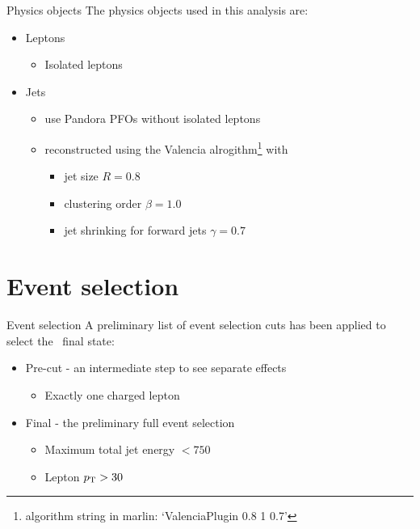 \documentclass{beamer}
\begin{document}
\begin{frame}{Physics objects}
The physics objects used in this analysis are:
\begin{itemize}
  \item Leptons
  \begin{itemize}
    \item Isolated leptons
  \end{itemize}
  \item Jets
  \begin{itemize}
    \item use Pandora PFOs without isolated leptons
    \item reconstructed using the Valencia alrogithm\footnote{algorithm string in marlin: `ValenciaPlugin 0.8 1 0.7'} with
    \begin{itemize}
      \item jet size $R=0.8$
      \item clustering order $\beta=1.0$
      \item jet shrinking for forward jets $\gamma=0.7$
    \end{itemize}
  \end{itemize}
\end{itemize}
\end{frame}










\section{Event selection}

\begin{frame}{Event selection}
A preliminary list of event selection cuts has been applied to select the \qqln\ final state:
\begin{itemize}
%
\item Pre-cut - an intermediate step to see separate effects
\begin{itemize}
\item Exactly one charged lepton
\end{itemize}
%
\item Final - the preliminary full event selection
\begin{itemize}
\item Maximum total jet energy $< 750$~\GeV
\item Lepton $p_\mathrm{T} > 30$~\GeV
\end{itemize}
%
\end{itemize}
\end{frame}
\end{document}
